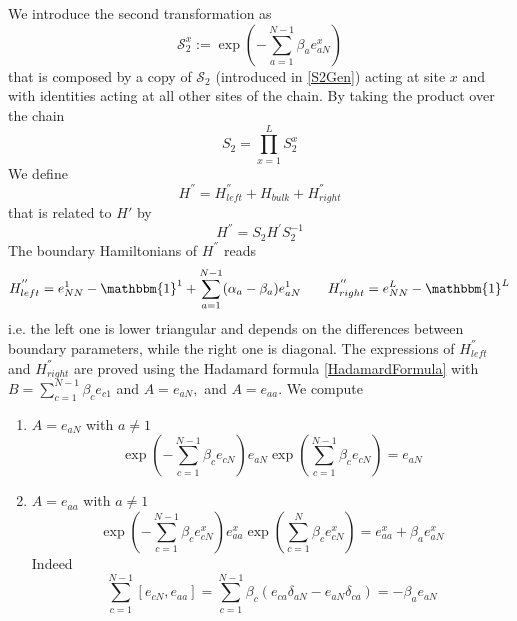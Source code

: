 \documentclass[10pt]{article}
\numberwithin{equation}{section}
\numberwithin{equation}{subsection}
\begin{document}
We introduce the second transformation as 
 \begin{equation}
 	\mathcal{S}_{2}^{x}:=\exp{\left(-\sum_{a=1}^{N-1}\beta_{a}e_{aN}^{x}\right)}%
 \end{equation}
that is composed by a copy of $\mathcal{S}_{2}$ (introduced in \eqref{S2Gen}) acting at site $x$ and with identities acting at all other sites of the chain. 
By taking the product over the chain
\begin{equation}\label{S2-Whole}
	S_{2}=\prod_{x=1}^{L}S_{2}^{x}
\end{equation}
We define 
\begin{equation}\label{HSecond}
	H^{''}=H_{left}^{''}+H_{bulk}+H_{right}^{''}
\end{equation}
that is related to $H'$ by
\begin{equation}
	H^{''}=S_{2}H^{'}S_{2}^{-1}
\end{equation}
The boundary Hamiltonians of $H^{''}$ reads
\begin{align}
	H_{left}^{''}=e_{NN}^{1}-\mathbbm{1}^{1}+\sum_{a=1}^{N-1}(\alpha_{a}-\beta_{a})e_{aN}^{1}\qquad H_{right}^{''}=e_{NN}^{L}-\mathbbm{1}^{L}
\end{align}
i.e. the left one is lower triangular and depends on the differences between boundary parameters, while the right one is diagonal. The expressions of $H_{left}^{''}$ and $H_{right}^{''}$ are proved using the Hadamard formula \eqref{HadamardFormula} with $B=\sum_{c=1}^{N-1}\beta_{c}e_{c1}$ and $A=e_{aN},$ and $A=e_{aa}$. We compute
\begin{enumerate}
	\item $A=e_{aN}$ with $a\neq 1$
	\begin{equation}
		\exp{\left(-\sum_{c=1}^{N-1}\beta_{c}e_{cN}\right)}e_{aN}\exp{\left(\sum_{c=1}^{N-1}\beta_{c}e_{cN}\right)}=e_{aN}
	\end{equation}
\item $A=e_{aa}$ with $a\neq 1$
\begin{equation}
		\exp{\left(-\sum_{c=1}^{N-1}\beta_{c}e_{cN}^{x}\right)}e_{aa}^{x}\exp{\left(\sum_{c=1}^{N}\beta_{c}e_{cN}^{x}\right)}=e_{aa}^{x}+\beta_{a}e_{aN}^{x}
	\end{equation}
Indeed 
\begin{equation}
	\sum_{c=1}^{N-1}[e_{cN},e_{aa}]=\sum_{c=1}^{N-1}\beta_{c}\left(e_{ca}\delta_{aN}-e_{aN}\delta_{ca}\right)=-\beta_{a}e_{aN}
\end{equation}
\end{enumerate}
\end{document}
